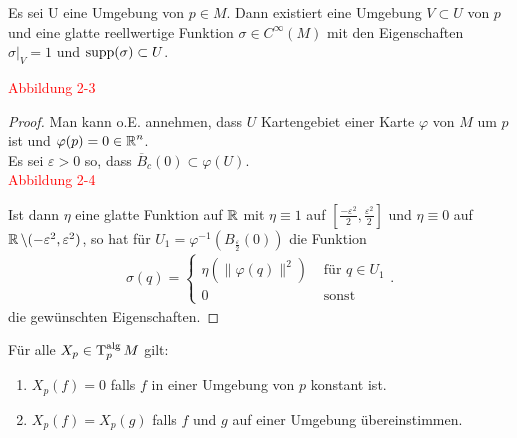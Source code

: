 \begin{lemma}
  Es sei U eine Umgebung von $p \in M$. Dann existiert eine Umgebung $V \subset U$ von $p$ und eine glatte reellwertige Funktion $\sigma \in C^{\infty}(M)$ mit den Eigenschaften $\sigma|_V = 1$ und $\operatorname{supp}(\sigma) \subset U$.
\end{lemma}

\textcolor{red}{Abbildung 2-3}


\begin{proof}
  Man kann o.E. annehmen, dass $U$ Kartengebiet einer Karte $\varphi$ von $M$ um $p$ ist und $\varphi(p) = 0 \in \operatorname{\mathbb{R}}^n$.\\

  Es sei $\varepsilon > 0$ so, dass $\overline B_c(0) \subset \varphi(U)$. \\

  \textcolor{red}{Abbildung 2-4}

  Ist dann $\eta$ eine glatte Funktion auf $\operatorname{\mathbb{R}}$ mit $\eta \equiv 1$ auf $\left[\frac{-\varepsilon^{2}}{2},\frac{\varepsilon^2}{2}\right]$ und $\eta \equiv 0$ auf $\operatorname{\mathbb{R}} \setminus (-\varepsilon^2,\varepsilon^2)$, so hat für $U_1 = \varphi^{-1}(B_{\frac{\varepsilon}{2}}(0))$ die Funktion
  \begin{align*}
    \sigma(q) =
    \begin{cases}
      \eta(\|\varphi(q)\|^2) & \text{ für } q \in U_1\\
      0 & \text{ sonst }
    \end{cases}.
  \end{align*}
  die gewünschten Eigenschaften.
\end{proof}

\begin{lemma}
Für alle $X_p\in\operatorname{T}_p^{\text{alg}}M$ gilt:
\begin{enumerate}[label=(\roman*),widest=ii]
\item $X_p(f) = 0$ falls $f$ in einer Umgebung von $p$ konstant ist.
\item $X_p(f) = X_p(g)$ falls $f$ und $g$ auf einer Umgebung übereinstimmen.
\end{enumerate}
\end{lemma}

